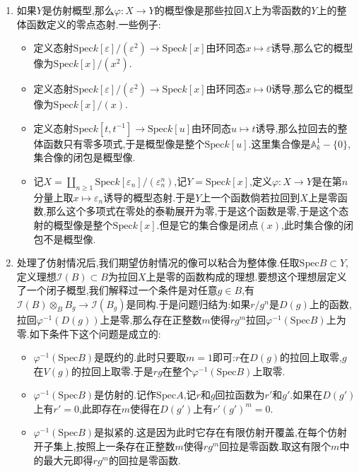 \begin{enumerate}
	\item 如果$Y$是仿射概型,那么$\varphi:X\to Y$的概型像是那些拉回$X$上为零函数的$Y$上的整体函数定义的零点态射.一些例子:
	\begin{itemize}
		\item 定义态射$\mathrm{Spec}k[\varepsilon]/(\varepsilon^2)\to\mathrm{Spec}k[x]$由环同态$x\mapsto\varepsilon$诱导,那么它的概型像为$\mathrm{Spec}k[x]/(x^2)$.
		\item 定义态射$\mathrm{Spec}k[\varepsilon]/(\varepsilon^2)\to\mathrm{Spec}k[x]$由环同态$x\mapsto0$诱导,那么它的概型像为$\mathrm{Spec}k[x]/(x)$.
		\item 定义态射$\mathrm{Spec}k[t,t^{-1}]\to\mathrm{Spec}k[u]$由环同态$u\mapsto t$诱导,那么拉回去的整体函数只有零多项式,于是概型像是整个$\mathrm{Spec}k[u]$.这里集合像是$\mathbb{A}_k^1-\{0\}$,集合像的闭包是概型像.
		\item 记$X=\coprod_{n\ge1}\mathrm{Spec}k[\varepsilon_n]/(\varepsilon_n^n)$,记$Y=\mathrm{Spec}k[x]$,定义$\varphi:X\to Y$是在第$n$分量上取$x\mapsto\varepsilon_n$诱导的概型态射.于是$Y$上一个函数倘若拉回到$X$上是零函数,那么这个多项式在零处的泰勒展开为零,于是这个函数是零,于是这个态射的概型像是整个$\mathrm{Spec}k[x]$.但是它的集合像是闭点$(x)$,此时集合像的闭包不是概型像.
	\end{itemize}
	\item 处理了仿射情况后,我们期望仿射情况的像可以粘合为整体像.任取$\mathrm{Spec}B\subset Y$,定义理想$\mathscr{I}(B)\subset B$为拉回$X$上是零的函数构成的理想.要想这个理想层定义了一个闭子概型,我们解释过一个条件是对任意$g\in B$,有$\mathscr{I}(B)\otimes_BB_g\to\mathscr{I}(B_g)$是同构.于是问题归结为:如果$r/g^n$是$D(g)$上的函数,拉回$\varphi^{-1}(D(g))$上是零,那么存在正整数$m$使得$rg^m$拉回$\varphi^{-1}(\mathrm{Spec}B)$上为零.如下条件下这个问题是成立的:
	\begin{itemize}
		\item $\varphi^{-1}(\mathrm{Spec}B)$是既约的.此时只要取$m=1$即可:$r$在$D(g)$的拉回上取零,$g$在$V(g)$的拉回上取零.于是$rg$在整个$\varphi^{-1}(\mathrm{Spec}B)$上取零.
		\item $\varphi^{-1}(\mathrm{Spec}B)$是仿射的.记作$\mathrm{Spec}A$,记$r$和$g$回拉函数为$r'$和$g'$.如果在$D(g')$上有$r'=0$,此即存在$m$使得在$D(g')$上有$r'(g')^m=0$.
		\item $\varphi^{-1}(\mathrm{Spec}B)$是拟紧的.这是因为此时它存在有限仿射开覆盖,在每个仿射开子集上,按照上一条存在正整数$m$使得$rg^m$回拉是零函数.取这有限个$m$中的最大元即得$rg^m$的回拉是零函数.
	\end{itemize}

\end{enumerate}
